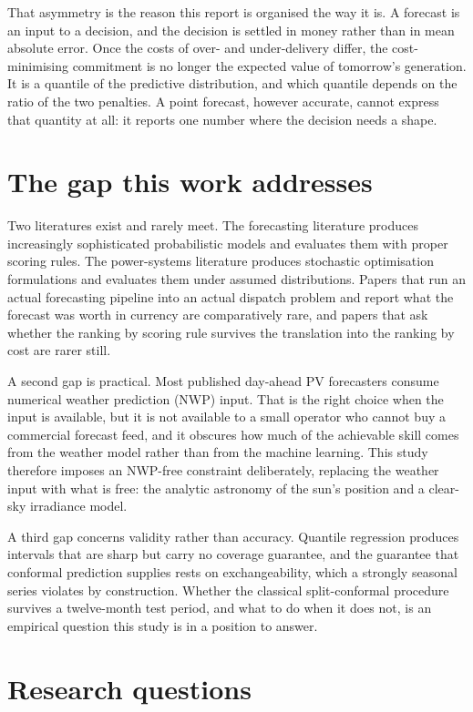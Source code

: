 \documentclass[11pt,a4paper,oneside]{report}
\begin{document}
That asymmetry is the reason this report is organised the way it is. A forecast is an input to a decision, and the decision is settled in money rather than in mean absolute error. Once the costs of over- and under-delivery differ, the cost-minimising commitment is no longer the expected value of tomorrow's generation. It is a quantile of the predictive distribution, and which quantile depends on the ratio of the two penalties. A point forecast, however accurate, cannot express that quantity at all: it reports one number where the decision needs a shape.

\section{The gap this work addresses}

Two literatures exist and rarely meet. The forecasting literature produces increasingly sophisticated probabilistic models and evaluates them with proper scoring rules. The power-systems literature produces stochastic optimisation formulations and evaluates them under assumed distributions. Papers that run an actual forecasting pipeline into an actual dispatch problem and report what the forecast was worth in currency are comparatively rare, and papers that ask whether the ranking by scoring rule survives the translation into the ranking by cost are rarer still.

A second gap is practical. Most published day-ahead PV forecasters consume numerical weather prediction (NWP) input. That is the right choice when the input is available, but it is not available to a small operator who cannot buy a commercial forecast feed, and it obscures how much of the achievable skill comes from the weather model rather than from the machine learning. This study therefore imposes an NWP-free constraint deliberately, replacing the weather input with what is free: the analytic astronomy of the sun's position and a clear-sky irradiance model.

A third gap concerns validity rather than accuracy. Quantile regression produces intervals that are sharp but carry no coverage guarantee, and the guarantee that conformal prediction supplies rests on exchangeability, which a strongly seasonal series violates by construction. Whether the classical split-conformal procedure survives a twelve-month test period, and what to do when it does not, is an empirical question this study is in a position to answer.

\section{Research questions}
\end{document}
